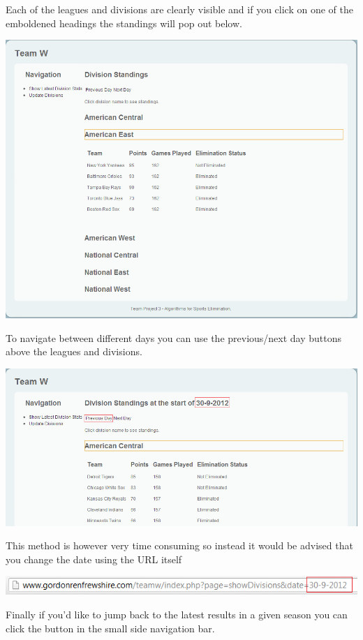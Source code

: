 \newpage

Each of the leagues and divisions are clearly visible and if you click on one of
the emboldened headings the standings will pop out below.

\includegraphics[width=\linewidth,keepaspectratio]{images/userManualWeb2.png}

\newpage

To navigate between different days you can use the previous/next day buttons
above the leagues and divisions.

\includegraphics[width=\linewidth,keepaspectratio]{images/userManualWeb3.png}

This method is however very time consuming so instead it would be advised that
you change the date using the URL itself

\includegraphics[width=\linewidth,keepaspectratio]{images/userManualWeb4.png}

Finally if you'd like to jump back to the latest results in a given season you
can click the button in the small side navigation bar.

